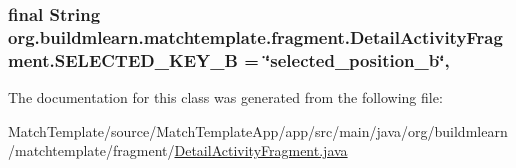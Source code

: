 \subsubsection[{\texorpdfstring{S\+E\+L\+E\+C\+T\+E\+D\+\_\+\+K\+E\+Y\+\_\+B}{SELECTED_KEY_B}}]{\setlength{\rightskip}{0pt plus 5cm}final String org.\+buildmlearn.\+matchtemplate.\+fragment.\+Detail\+Activity\+Fragment.\+S\+E\+L\+E\+C\+T\+E\+D\+\_\+\+K\+E\+Y\+\_\+B = \char`\"{}selected\+\_\+position\+\_\+b\char`\"{}\hspace{0.3cm}{\ttfamily [static]}, {\ttfamily [private]}}\hypertarget{classorg_1_1buildmlearn_1_1matchtemplate_1_1fragment_1_1DetailActivityFragment_adf0c07a60092da7144fc865c581e99b2}{}\label{classorg_1_1buildmlearn_1_1matchtemplate_1_1fragment_1_1DetailActivityFragment_adf0c07a60092da7144fc865c581e99b2}


The documentation for this class was generated from the following file\+:\begin{DoxyCompactItemize}
\item 
Match\+Template/source/\+Match\+Template\+App/app/src/main/java/org/buildmlearn/matchtemplate/fragment/\hyperlink{MatchTemplate_2source_2MatchTemplateApp_2app_2src_2main_2java_2org_2buildmlearn_2matchtemplate_214ffae52d596ba7c06cdf792c03758c2}{Detail\+Activity\+Fragment.\+java}\end{DoxyCompactItemize}
